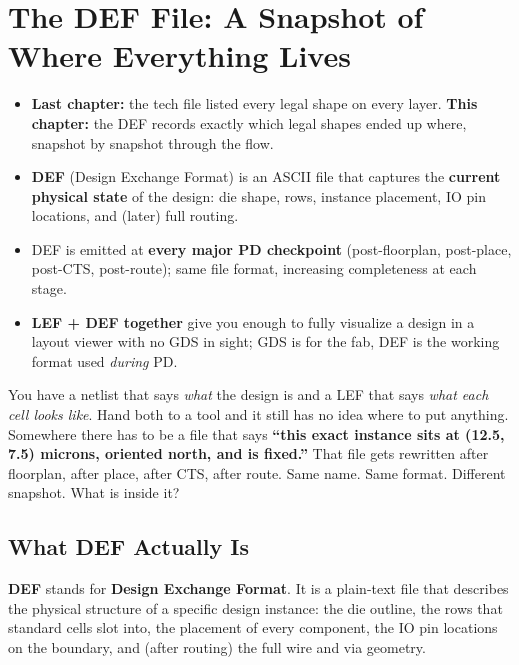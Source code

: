 \chapter{The DEF File: A Snapshot of Where Everything Lives}

\begin{tldr}
\begin{itemize}
  \item \textbf{Last chapter:} the tech file listed every legal shape on every layer. \textbf{This chapter:} the DEF records exactly which legal shapes ended up where, snapshot by snapshot through the flow.
  \item \textbf{DEF} (Design Exchange Format) is an ASCII file that captures the \textbf{current physical state} of the design: die shape, rows, instance placement, IO pin locations, and (later) full routing.
  \item DEF is emitted at \textbf{every major PD checkpoint} (post-floorplan, post-place, post-CTS, post-route); same file format, increasing completeness at each stage.
  \item \textbf{LEF + DEF together} give you enough to fully visualize a design in a layout viewer with no GDS in sight; GDS is for the fab, DEF is the working format used \emph{during} PD.
\end{itemize}
\end{tldr}

\begin{hook}
You have a netlist that says \emph{what} the design is and a LEF that says \emph{what each cell looks like}. Hand both to a tool and it still has no idea where to put anything. Somewhere there has to be a file that says \textbf{``this exact instance sits at (12.5, 7.5) microns, oriented north, and is fixed.''} That file gets rewritten after floorplan, after place, after CTS, after route. Same name. Same format. Different snapshot. What is inside it?
\end{hook}

\section{What DEF Actually Is}

\textbf{DEF} stands for \textbf{Design Exchange Format}. It is a plain-text file that describes the physical structure of a specific design instance: the die outline, the rows that standard cells slot into, the placement of every component, the IO pin locations on the boundary, and (after routing) the full wire and via geometry.

